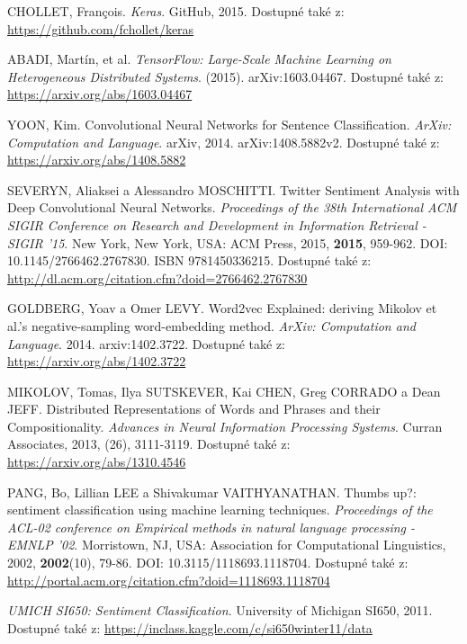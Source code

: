 \documentclass[12pt, a4paper]{article}
\numberwithin{equation}{section} 	%
\begin{document}
\newpage
\begin{thebibliography}{99}

    CHOLLET, Fran\c{c}ois. \textit{Keras}. GitHub, 2015. Dostupné také z: \url{https://github.com/fchollet/keras}

    ABADI, Martín, et al. \textit{TensorFlow: Large-Scale Machine Learning on Heterogeneous Distributed Systems}. (2015). arXiv:1603.04467. Dostupné také z: \url{https://arxiv.org/abs/1603.04467}

    YOON, Kim. Convolutional Neural Networks for Sentence Classification. \textit{ArXiv: Computation and Language}. arXiv, 2014. arXiv:1408.5882v2. Dostupné také z: \url{https://arxiv.org/abs/1408.5882}

    SEVERYN, Aliaksei a Alessandro MOSCHITTI. Twitter Sentiment Analysis with Deep Convolutional Neural Networks. \textit{Proceedings of the 38th International ACM SIGIR Conference on Research and Development in Information Retrieval - SIGIR '15}. New York, New York, USA: ACM Press, 2015, \textbf{2015}, 959-962. DOI: 10.1145/2766462.2767830. ISBN 9781450336215. Dostupné také z: \url{http://dl.acm.org/citation.cfm?doid=2766462.2767830}

    GOLDBERG, Yoav a Omer LEVY. Word2vec Explained: deriving Mikolov et al.'s negative-sampling word-embedding method. \textit{ArXiv: Computation and Language}. 2014. arxiv:1402.3722. Dostupné také z: \url{https://arxiv.org/abs/1402.3722}

    MIKOLOV, Tomas, Ilya SUTSKEVER, Kai CHEN, Greg CORRADO a Dean JEFF. Distributed Representations of Words and Phrases and their Compositionality. \textit{Advances in Neural Information Processing Systems}. Curran Associates, 2013, (26), 3111-3119. Dostupné také z: \url{https://arxiv.org/abs/1310.4546}

    PANG, Bo, Lillian LEE a Shivakumar VAITHYANATHAN. Thumbs up?: sentiment classification using machine learning techniques. \textit{Proceedings of the ACL-02 conference on Empirical methods in natural language processing - EMNLP '02}. Morristown, NJ, USA: Association for Computational Linguistics, 2002, \textbf{2002}(10), 79-86. DOI: 10.3115/1118693.1118704. Dostupné také z: \url{http://portal.acm.org/citation.cfm?doid=1118693.1118704}

    \textit{UMICH SI650: Sentiment Classification}. University of Michigan SI650, 2011. Dostupné také z: \url{https://inclass.kaggle.com/c/si650winter11/data}


\end{thebibliography}
\end{document}
